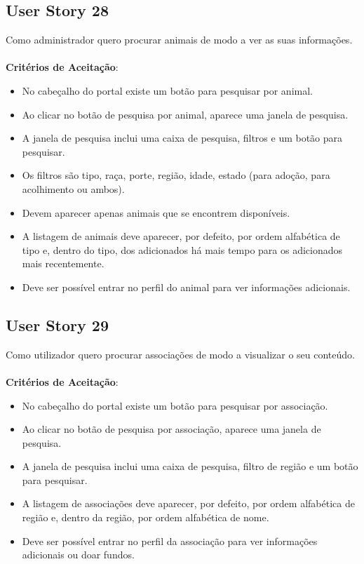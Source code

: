 \documentclass[a4paper,11pt]{article}
\begin{document}
\subsection*{User Story 28}
Como administrador quero procurar animais de modo a ver as suas informações.\\\\
\textbf{Critérios de Aceitação}:
\begin{itemize}
  \item No cabeçalho do portal existe um botão para pesquisar por animal.
  \item Ao clicar no botão de pesquisa por animal, aparece uma janela de pesquisa.
  \item A janela de pesquisa inclui uma caixa de pesquisa, filtros e um botão para pesquisar.
  \item Os filtros são tipo, raça, porte, região, idade, estado (para adoção, para acolhimento ou ambos).
  \item Devem aparecer apenas animais que se encontrem disponíveis.
  \item A listagem de animais deve aparecer, por defeito, por ordem alfabética de tipo e, dentro do tipo, dos adicionados há mais tempo para os adicionados mais recentemente.
  \item Deve ser possível entrar no perfil do animal para ver informações adicionais.
\end{itemize}

\subsection*{User Story 29}
Como utilizador quero procurar associações de modo a visualizar o seu conteúdo.\\\\
\textbf{Critérios de Aceitação}:
\begin{itemize}
  \item No cabeçalho do portal existe um botão para pesquisar por associação.
  \item Ao clicar no botão de pesquisa por associação, aparece uma janela de pesquisa.
  \item A janela de pesquisa inclui uma caixa de pesquisa, filtro de região e um botão para pesquisar.
  \item A listagem de associações deve aparecer, por defeito, por ordem alfabética de região e, dentro da região, por ordem alfabética de nome.
  \item Deve ser possível entrar no perfil da associação para ver informações adicionais ou doar fundos.
\end{itemize}
\end{document}
